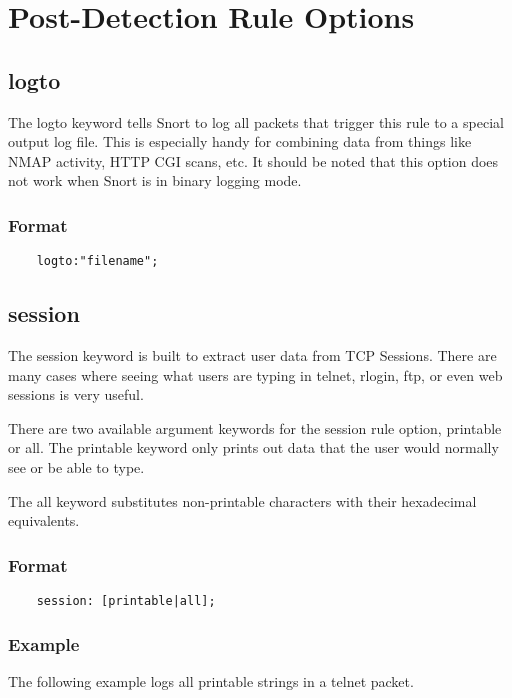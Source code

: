 \documentclass[english]{report}
\begin{document}
\section{Post-Detection Rule Options}
\subsection{logto}

The logto keyword tells Snort to log all packets that trigger this rule to a
special output log file. This is especially handy for combining data from
things like NMAP activity, HTTP CGI scans, etc. It should be noted that this
option does not work when Snort is in binary logging mode.

\subsubsection{Format}

\begin{verbatim}
    logto:"filename";
\end{verbatim}

\subsection{session}

The session keyword is built to extract user data from TCP Sessions.  There are
many cases where seeing what users are typing in telnet, rlogin, ftp, or even
web sessions is very useful. 

There are two available argument keywords for the session rule option,
printable or all. The printable keyword only prints out data that the user
would normally see or be able to type. 

The all keyword substitutes non-printable characters with their hexadecimal
equivalents. 

\subsubsection{Format}

\begin{verbatim}
    session: [printable|all];
\end{verbatim}

\subsubsection{Example}

The following example logs all printable strings in a telnet packet.
\end{document}
